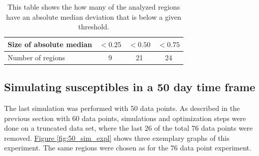 \begin{table}[h]
	\centering
	\caption{This table shows the how many of the analyzed regions have an absolute median deviation that is below a given threshold.}
	\begin{tabular}{|l||c|c|c|}
		\hline
		Size of absolute median & $< 0.25$ & $< 0.50$ & $< 0.75$ \\ \hline
		Number of regions & 9 & 21 & 24 \\ \hline
	\end{tabular}
	\label{tab:60d_regions}
\end{table}

\subsection{Simulating susceptibles in a 50 day time frame}
The last simulation was performed with 50 data points. As described in the previous section with 60 data points, simulations and
optimization steps were done on a truncated data set, where the last 26 of the total 76 data points were removed.
\hyperref[fig:50_sim_expl]{Figure \ref*{fig:50_sim_expl}} shows three exemplary graphs of this
experiment. The same regions were chosen as for the 76 data point experiment. 

